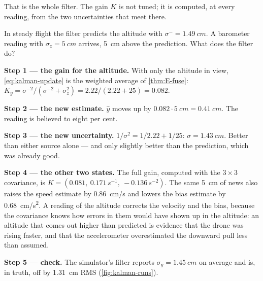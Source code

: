 That is the whole filter. The gain $K$ is not tuned; it is computed, at every reading, from the two uncertainties that meet there.

\begin{example}
\label{ex:kalman-one}
In steady flight the filter predicts the altitude with $\sigma^- = \SI{1.49}{cm}$. A barometer reading with $\sigma_z = \SI{5}{cm}$ arrives, \SI{5}{cm} above the prediction. What does the filter do?

\textbf{Step 1 — the gain for the altitude.} With only the altitude in view, \cref{eq:kalman-update} is the weighted average of \cref{thm:E-fuse}: $K_y = \sigma^{-2}/(\sigma^{-2} + \sigma_z^2) = 2.22/(2.22 + 25) = 0.082$.

\textbf{Step 2 — the new estimate.} $\hat y$ moves up by $0.082 \cdot \SI{5}{cm} = \SI{0.41}{cm}$. The reading is believed to eight per cent.

\textbf{Step 3 — the new uncertainty.} $1/\sigma^2 = 1/2.22 + 1/25$: $\sigma = \SI{1.43}{cm}$. Better than either source alone — and only slightly better than the prediction, which was already good.

\textbf{Step 4 — the other two states.} The full gain, computed with the $3 \times 3$ covariance, is $K = (0.081,\ 0.171\,\si{s^{-1}},\ -0.136\,\si{s^{-2}})$. The same \SI{5}{cm} of news also raises the speed estimate by \SI{0.86}{cm/s} and lowers the bias estimate by \SI{0.68}{cm/s^2}. A reading of the altitude corrects the velocity and the bias, because the covariance knows how errors in them would have shown up in the altitude: an altitude that comes out higher than predicted is evidence that the drone was rising faster, and that the accelerometer overestimated the downward pull less than assumed.

\textbf{Step 5 — check.} The simulator's filter reports $\sigma_y = \SI{1.45}{cm}$ on average and is, in truth, off by \SI{1.31}{cm} RMS (\cref{fig:kalman-runs}).
\end{example}



